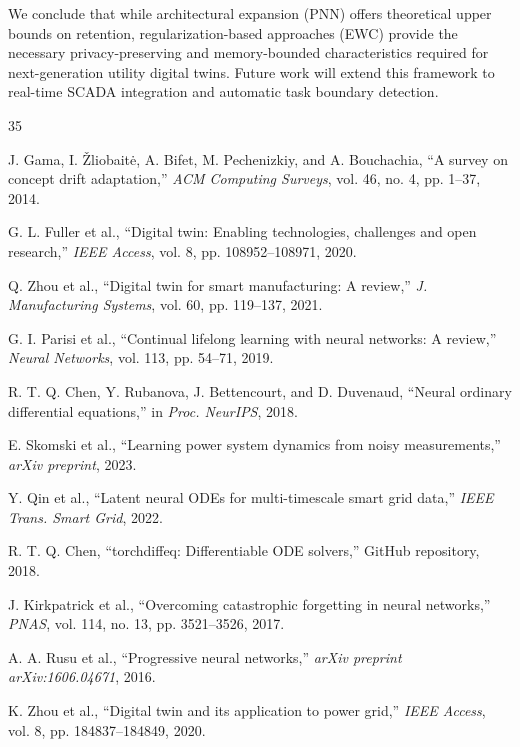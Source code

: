 \documentclass[journal,12pt,onecolumn]{IEEEtran}
\begin{document}
We conclude that while architectural expansion (PNN) offers theoretical upper bounds on retention, regularization-based approaches (EWC) provide the necessary privacy-preserving and memory-bounded characteristics required for next-generation utility digital twins. Future work will extend this framework to real-time SCADA integration and automatic task boundary detection.


\begin{thebibliography}{35}

J. Gama, I. Žliobaitė, A. Bifet, M. Pechenizkiy, and A. Bouchachia, ``A survey on concept drift adaptation,'' \emph{ACM Computing Surveys}, vol. 46, no. 4, pp. 1--37, 2014.

G. L. Fuller et al., ``Digital twin: Enabling technologies, challenges and open research,'' \emph{IEEE Access}, vol. 8, pp. 108952--108971, 2020.

Q. Zhou et al., ``Digital twin for smart manufacturing: A review,'' \emph{J. Manufacturing Systems}, vol. 60, pp. 119--137, 2021.

G. I. Parisi et al., ``Continual lifelong learning with neural networks: A review,'' \emph{Neural Networks}, vol. 113, pp. 54--71, 2019.

R. T. Q. Chen, Y. Rubanova, J. Bettencourt, and D. Duvenaud, ``Neural ordinary differential equations,'' in \emph{Proc. NeurIPS}, 2018.

E. Skomski et al., ``Learning power system dynamics from noisy measurements,'' \emph{arXiv preprint}, 2023.

Y. Qin et al., ``Latent neural ODEs for multi-timescale smart grid data,'' \emph{IEEE Trans. Smart Grid}, 2022.

R. T. Q. Chen, ``torchdiffeq: Differentiable ODE solvers,'' GitHub repository, 2018.

J. Kirkpatrick et al., ``Overcoming catastrophic forgetting in neural networks,'' \emph{PNAS}, vol. 114, no. 13, pp. 3521--3526, 2017.

A. A. Rusu et al., ``Progressive neural networks,'' \emph{arXiv preprint arXiv:1606.04671}, 2016.

K. Zhou et al., ``Digital twin and its application to power grid,'' \emph{IEEE Access}, vol. 8, pp. 184837--184849, 2020.


\end{thebibliography}
\end{document}
